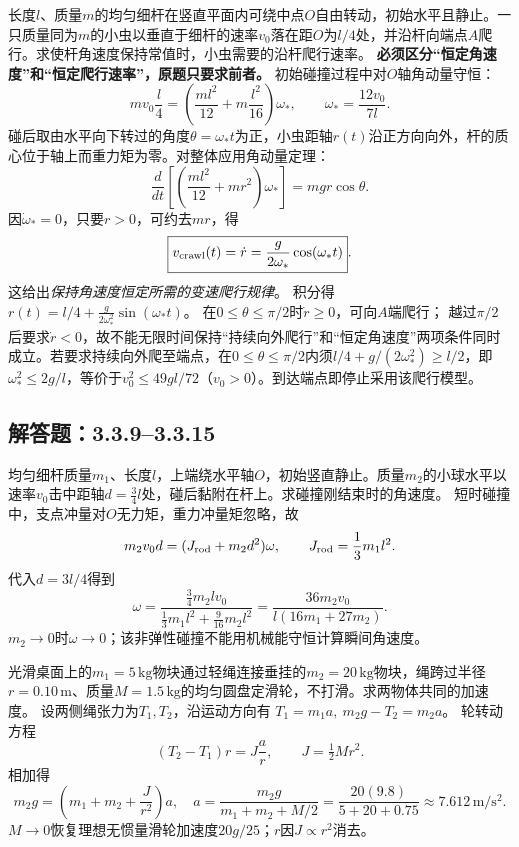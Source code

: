 \problemtext 长度$l$、质量$m$的均匀细杆在竖直平面内可绕中点$O$自由转动，初始水平且静止。一只质量同为$m$的小虫以垂直于细杆的速率$v_0$落在距$O$为$l/4$处，并沿杆向端点$A$爬行。求使杆角速度保持常值时，小虫需要的沿杆爬行速率。
\workings
\textbf{必须区分“恒定角速度”和“恒定爬行速率”，原题只要求前者。}
初始碰撞过程中对$O$轴角动量守恒：
\[
m v_0\frac l4
=\left(\frac{ml^2}{12}+m\frac{l^2}{16}\right)\omega_*,
\qquad \boxed{\omega_*=\frac{12v_0}{7l}}.
\]
碰后取由水平向下转过的角度$\theta=\omega_* t$为正，小虫距轴$r(t)$沿正方向向外，杆的质心位于轴上而重力矩为零。对整体应用角动量定理：
\[
\frac{d}{dt}\left[\left(\frac{ml^2}{12}+mr^2\right)\omega_*\right]
=mg r\cos\theta.
\]
因$\dot\omega_*=0$，只要$r>0$，可约去$mr$，得
\[
\boxed{v_{\rm crawl}(t)=\dot r
=\frac{g}{2\omega_*}\cos(\omega_*t)}.
\]
这给出\emph{保持角速度恒定所需的变速爬行规律}。
积分得
$r(t)=l/4+\frac{g}{2\omega_*^2}\sin(\omega_*t)$。
\crosscheck 在$0\le\theta\le\pi/2$时$\dot r\ge0$，可向$A$端爬行；
越过$\pi/2$后要求$\dot r<0$，故不能无限时间保持“持续向外爬行”和“恒定角速度”两项条件同时成立。若要求持续向外爬至端点，在$0\le\theta\le\pi/2$内须$l/4+g/(2\omega_*^2)\ge l/2$，即$\omega_*^2\le2g/l$，等价于$v_0^2\le49gl/72$（$v_0>0$）。到达端点即停止采用该爬行模型。

\subsection{解答题：3.3.9--3.3.15}

\problemtext 均匀细杆质量$m_1$、长度$l$，上端绕水平轴$O$，初始竖直静止。质量$m_2$的小球水平以速率$v_0$击中距轴$d=\frac34l$处，碰后黏附在杆上。求碰撞刚结束时的角速度。
\workings
短时碰撞中，支点冲量对$O$无力矩，重力冲量矩忽略，故
\[
m_2v_0d=(J_{\rm rod}+m_2d^2)\omega,\qquad
J_{\rm rod}=\frac13m_1l^2.
\]
代入$d=3l/4$得到
\[
\boxed{\omega=
\frac{\frac34m_2lv_0}
{\frac13m_1l^2+\frac9{16}m_2l^2}
=\frac{36m_2v_0}{l(16m_1+27m_2)}}.
\]
\crosscheck $m_2\to0$时$\omega\to0$；该非弹性碰撞不能用机械能守恒计算瞬间角速度。

\problemtext 光滑桌面上的$m_1=5\,\mathrm{kg}$物块通过轻绳连接垂挂的$m_2=20\,\mathrm{kg}$物块，绳跨过半径$r=0.10\,\mathrm m$、质量$M=1.5\,\mathrm{kg}$的均匀圆盘定滑轮，不打滑。求两物体共同的加速度。
\workings
设两侧绳张力为$T_1,T_2$，沿运动方向有
$T_1=m_1a,\ m_2g-T_2=m_2a$。
轮转动方程
\[
(T_2-T_1)r=J\frac ar,\qquad J=\tfrac12Mr^2.
\]
相加得
\[
m_2g=\left(m_1+m_2+\frac J{r^2}\right)a,
\quad\boxed{
a=\frac{m_2g}{m_1+m_2+M/2}
=\frac{20(9.8)}{5+20+0.75}
\approx7.612\,\mathrm{m/s^2}}.
\]
\crosscheck $M\to0$恢复理想无惯量滑轮加速度$20g/25$；$r$因$J\propto r^2$消去。

